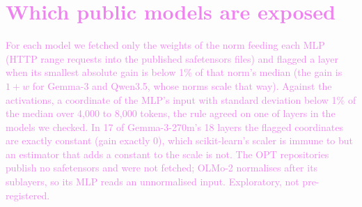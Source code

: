 \documentclass[10pt]{article}
\newcommand{\draft}[1]{\textcolor{violet}{#1}}
\begin{document}
\FloatBarrier
\section{\draft{Which public models are exposed}}
\label{app:map}
\draft{For each model we fetched only the weights of the norm feeding each MLP (HTTP range requests
into the published safetensors files) and flagged a layer when its smallest absolute gain is below
1\% of that norm's median (the gain is $1+w$ for Gemma-3 and Qwen3.5, whose norms scale that way).
Against the activations, a coordinate of the MLP's input with standard deviation below 1\% of the
median over 4{,}000 to 8{,}000 tokens, the rule agreed on \mapAgree{} one of \mapLayers{} layers in
the \mapChecked{} models we checked. In 17 of Gemma-3-270m's 18 layers the flagged coordinates are
exactly constant (gain exactly 0), which scikit-learn's scaler is immune to but an estimator that adds
a constant to the scale is not. The OPT repositories publish no safetensors and were not fetched;
OLMo-2 normalises after its sublayers, so its MLP reads an unnormalised input. Exploratory, not
pre-registered.}

\begin{table}[h]
\centering
\scriptsize

\caption{\draft{Layers flagged by the gain rule in each model, read from the weights alone.}}
\label{tab:map}
\end{table}

\FloatBarrier
\end{document}
